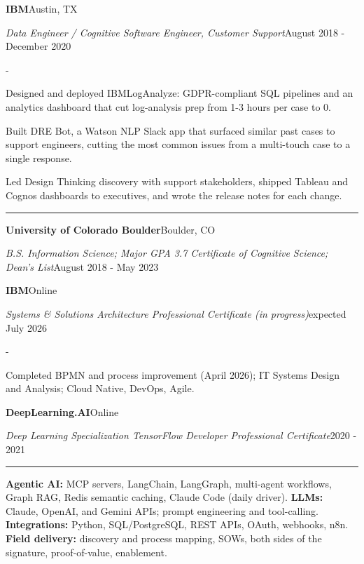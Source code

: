 \documentclass[10pt,letterpaper]{article}
\newenvironment{cvitems}{%
  \begin{list}{-}{%
    \setlength{\leftmargin}{12pt}%
    \setlength{\itemsep}{1.2pt}%
    \setlength{\parsep}{0pt}%
    \setlength{\topsep}{1.5pt}%
    \setlength{\partopsep}{0pt}%
    \setlength{\labelwidth}{6pt}%
    \setlength{\labelsep}{6pt}%
    \setlength{\itemindent}{0pt}%
  }%
}{\end{list}}
\newcommand{\cvsection}[1]{%
  \vspace{7pt}%
  \noindent{\bfseries\fontsize{11pt}{13pt}\selectfont\MakeUppercase{#1}}\par
  \vspace{1pt}%
  \noindent\rule{\textwidth}{0.4pt}\par
  \vspace{4pt}%
}
\newcommand{\cventryhead}[4]{%
  \noindent\textbf{#1}\hfill#2\par
  \vspace{0.5pt}%
  \noindent\textit{#3}\hfill#4\par
}
\newcommand{\cveduhead}[4]{%
  \noindent\textbf{#1}\hfill#2\par
  \vspace{0.5pt}%
  \noindent\textit{#3}\hfill#4\par
}
\begin{document}
\vspace{3pt}
\cventryhead{IBM}{Austin, TX}
{Data Engineer / Cognitive Software Engineer, Customer Support}{August 2018 - December 2020}
\begin{cvitems}
  \item Designed and deployed IBMLogAnalyze: GDPR-compliant SQL pipelines and an analytics dashboard that cut log-analysis prep from 1-3 hours per case to 0.
  \item Built DRE Bot, a Watson NLP Slack app that surfaced similar past cases to support engineers, cutting the most common issues from a multi-touch case to a single response.
  \item Led Design Thinking discovery with support stakeholders, shipped Tableau and Cognos dashboards to executives, and wrote the release notes for each change.
\end{cvitems}

\cvsection{Education}

\cveduhead{University of Colorado Boulder}{Boulder, CO}
{B.S. Information Science; Major GPA 3.7 \textbar{} Certificate of Cognitive Science; Dean's List}{August 2018 - May 2023}

\vspace{3pt}
\cveduhead{IBM}{Online}
{Systems \& Solutions Architecture Professional Certificate (in progress)}{expected July 2026}
\begin{cvitems}
  \item Completed BPMN and process improvement (April 2026); IT Systems Design and Analysis; Cloud Native, DevOps, Agile.
\end{cvitems}

\vspace{3pt}
\cveduhead{DeepLearning.AI}{Online}
{Deep Learning Specialization \textbar{} TensorFlow Developer Professional Certificate}{2020 - 2021}

\cvsection{Skills}

{\raggedright
\noindent\textbf{Agentic AI:} MCP servers, LangChain, LangGraph, multi-agent workflows, Graph RAG, Redis semantic caching, Claude Code (daily driver). \textbf{LLMs:} Claude, OpenAI, and Gemini APIs; prompt engineering and tool-calling. \textbf{Integrations:} Python, SQL/PostgreSQL, REST APIs, OAuth, webhooks, n8n. \textbf{Field delivery:} discovery and process mapping, SOWs, both sides of the signature, proof-of-value, enablement.\par
}
\end{document}
